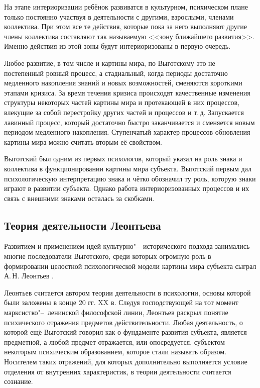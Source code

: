 На этапе интериоризации ребёнок развиватся в культурном, психическом плане только постоянно участвуя в деятельности с другими, взрослыми, членами коллектива. При этом все те действия, которые пока за него выполняют другие члены коллектива составляют так называемую <<зону ближайшего развития>>. Именно действия из этой зоны будут интериоризованы в первую очередь.

Любое развитие, в том числе и картины мира, по Выготскому это не постепенный ровный процесс, а стадиальный, когда периоды достаточно медленного накопления знаний и новых возможностей, сменяются короткими этапами кризиса. За время течения кризиса происходят качественные изменения структуры некоторых частей картины мира и протекающей в них процессов, влекущие за собой перестройку других частей и процессов и т.\,д. Запускается лавинный процесс, который достаточно быстро заканчивается и сменяется новым периодом медленного накопления. Ступенчатый характер процессов обновления картины мира можно считать вторым её свойством.

Выготский был одним из первых психологов, который указал на роль знака и коллектива в функционировании картины мира субъекта. Выготский первым дал психологическую интерпретацию знака и чётко обозначил ту роль, которую знаки играют в развитии субъекта. Однако работа интериоризованных процессов и их связь с внешними знаками осталась за скобками.

\subsection{Теория деятельности Леонтьева}

Развитием и применением идей культурно"--~исторического подхода занимались многие последователи Выготского, среди которых огромную роль в формировании целостной психологической модели картины мира субъекта сыграл А.\,Н. Леонтьев \cite{Leontiev1975}.

Леонтьев считается автором теории деятельности в психологии, основы которой были заложены в конце 20 гг. XX в. Следуя господствующей на тот момент марксистко"--~ленинской философской линии, Леонтьев раскрыл понятие психического отражения предметов действительности. Любая деятельность, о которой ещё Выготский говорил как о фундаменте развития субъекта, является предметной, а любой предмет отражается, или опосредуется, субъектом некоторым психическим образованием, которое стали называть образом. Носителем таких отражений, для которых дополнительно выполняется условие отделения от внутренних характеристик, в теории деятельности считается сознание.

